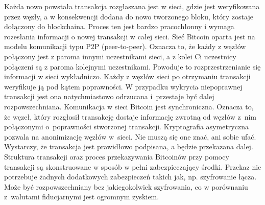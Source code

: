 \documentclass[12pt, twoside, final, openany]{mgr}
\begin{document}
\indent Każda nowo powstała transakcja rozgłaszana jest w sieci, gdzie jest weryfikowana przez węzły, a w konsekwencji dodana do nowo tworzonego bloku, który zostaje dołączony do blockchaina. Proces ten jest bardzo pracochłonny i wymaga rozesłania informacji o nowej transakcji w całej sieci. Sieć Bitcoin oparta jest na modelu komunikacji typu P2P (peer-to-peer). Oznacza to, że każdy z węzłów połączony jest z paroma innymi uczestnikami sieci, a z kolei Ci uczestnicy połączeni są z paroma kolejnymi uczestnikami. Powoduje to rozprzestrzenianie się informacji w sieci wykładniczo. Każdy z węzłów sieci po otrzymaniu transakcji weryfikuje ją pod kątem poprawności. W przypadku wykrycia niepoprawnej transakcji jest ona natychmiastowo odrzucana i~przestaje być dalej rozpowszechniana. Komunikacja w sieci Bitcoin jest synchroniczna. Oznacza to, że węzeł, który rozgłosił transakcję dostaje informację zwrotną od węzłów z~nim połączonymi o~poprawności stworzonej transakcji. Kryptografia asymetryczna pozwala na anonimizację węzłów w~sieci. Nie muszą się one znać, ani sobie ufać. Wystarczy, że transakcja jest prawidłowo podpisana, a będzie przekazana dalej. Struktura transakcji oraz proces przekazywania Bitcoinów przy pomocy transakcji są skonstruowane w sposób w pełni zabezpieczający środki. Przekaz nie potrzebuje żadnych dodatkowych zabezpieczeń takich jak, np. szyfrowanie łącza. Może być rozpowszechniany bez jakiegokolwiek szyfrowania, co w porównaniu z~walutami fiducjarnymi jest ogromnym zyskiem\cite{Mastering}.
\end{document}
